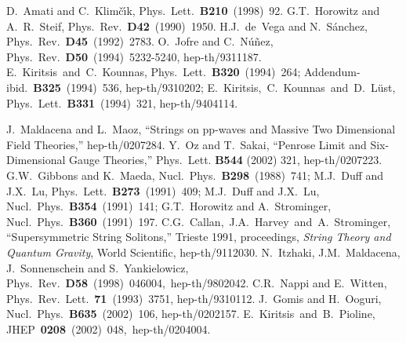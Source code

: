 \documentclass[a4paper,12pt]{article}
\begin{document}
\begin{thebibliography}{99}
D.~Amati and C.~Klim\v{c}\'{\i}k,
Phys.~Lett.~{\bf B210}~(1998)~92.
G.T.~Horowitz and A.~R.~Steif,
Phys.~Rev.~{\bf D42}~(1990)~1950.
H.J.~de~Vega and N.~S\'anchez,
Phys.~Rev.~{\bf D45}~(1992)~2783.
O.~Jofre and  C.~N\'{u}\~{n}ez,
Phys.~Rev.~{\bf  D50}~(1994)~5232-5240, hep-th/9311187.
E.~Kiritsis~and~C.~Kounnas,
Phys.~Lett.~{\bf B320}~(1994)~264; Addendum-ibid.~{\bf B325}~(1994)~536, 
hep-th/9310202;
E.~Kiritsis,~C.~Kounnas~and~D.~L\"ust,
Phys.~Lett.~{\bf B331}~(1994)~321, hep-th/9404114.

J.~Maldacena and L.~Maoz,
``Strings on pp-waves and Massive Two Dimensional Field Theories,''
hep-th/0207284.
Y.~Oz and T.~Sakai,
``Penrose Limit and Six-Dimensional Gauge Theories,''
Phys.~Lett. {\bf B544} (2002) 321, hep-th/0207223.
G.W.~Gibbons and K.~Maeda, 
Nucl.~Phys.~{\bf B298}~(1988)~741;
M.J.~Duff and J.X.~Lu,
Phys.~Lett.~{\bf B273}~(1991)~409;
M.J.~Duff and J.X.~Lu,
Nucl.~Phys.~{\bf B354}~(1991)~141;
G.T.~Horowitz and A.~Strominger, 
Nucl.~Phys.~{\bf B360}~(1991)~197.
C.G.~Callan,~J.A.~Harvey~and~A.~Strominger,~
``Supersymmetric String Solitons,''
Trieste 1991, proceedings, {\it String Theory
and Quantum Gravity}, World Scientific, 
hep-th/9112030.
N.~Itzhaki, J.M.~Maldacena, J.~Sonnenschein
and S.~Yankielowicz,\\
Phys.~Rev.~{\bf D58}~(1998)~046004,~hep-th/9802042.
C.R.~Nappi and E.~Witten, 
Phys.~Rev.~Lett.~{\bf 71}~(1993)~3751, hep-th/9310112.
J.~Gomis and H.~Ooguri,
Nucl.~Phys.~{\bf B635}~(2002)~106, hep-th/0202157.
E.~Kiritsis~and~B.~Pioline,
JHEP~{\bf 0208}~(2002)~048,~hep-th/0204004.


\end{thebibliography}
\end{document}
